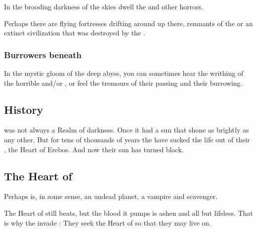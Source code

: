 In the brooding darkness of the skies dwell the  and other horrors. 

Perhaps there are flying fortresses drifting around up there, remnants of the  or an extinct \erebean{} civilization that was destroyed by the \banes. 






\subsubsection{Burrowers beneath}
In the mystic gloom of the deep abyss, you can sometimes hear the writhing of the horrible  and/or , or feel the tremours of their passing and their burrowing.









\subsection{History}
\Erebos{} was not always a Realm of darkness. 
Once it had a sun that shone as brightly as any other. 
But for tens of thousands of years the \banes{} have sucked the life out of their , the Heart of Erebos. 
And now their sun has turned black. 









\subsection{The Heart of \Erebos}
Perhaps \Erebos{} is, in some sense, an undead planet, a vampire and scavenger.

The Heart of \Erebos{} still beats, but the blood it pumps is ashen and all but lifeless. That is why the \banes{} invade \Miith{}: They seek the Heart of \Miith{} so that they may live on. 















